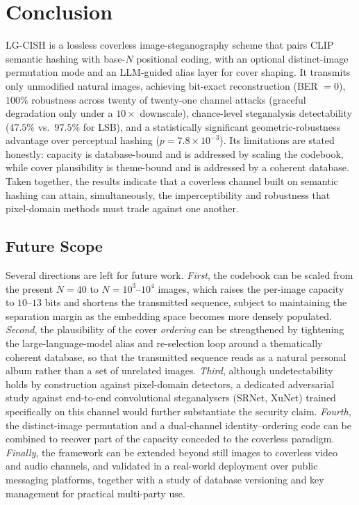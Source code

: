 \documentclass[11pt]{article}
\theoremstyle{definition}
\begin{document}
\section{Conclusion}\label{sec:conclusion}
LG-CISH is a lossless coverless image-steganography scheme that pairs CLIP
semantic hashing with base-$N$ positional coding, with an optional distinct-image
permutation mode and an LLM-guided alias layer for cover shaping. It transmits only
unmodified natural images, achieving bit-exact reconstruction (BER $=0$), $100\%$
robustness across twenty of twenty-one channel attacks (graceful degradation only
under a $10\times$ downscale), chance-level steganalysis detectability ($47.5\%$
vs.\ $97.5\%$ for LSB), and a statistically significant geometric-robustness
advantage over perceptual hashing ($p{=}7.8\times10^{-3}$). Its limitations are
stated honestly: capacity is database-bound and is addressed by scaling the
codebook, while cover plausibility is theme-bound and is addressed by a coherent
database. Taken together, the results indicate that a coverless channel built on
semantic hashing can attain, simultaneously, the imperceptibility and robustness
that pixel-domain methods must trade against one another.

\subsection{Future Scope}\label{sec:future}
Several directions are left for future work. \emph{First}, the codebook can be
scaled from the present $N{=}40$ to $N{=}10^{3}$--$10^{4}$ images, which raises the
per-image capacity to $10$--$13$ bits and shortens the transmitted sequence, subject
to maintaining the separation margin as the embedding space becomes more densely
populated. \emph{Second}, the plausibility of the cover \emph{ordering} can be
strengthened by tightening the large-language-model alias and re-selection loop
around a thematically coherent database, so that the transmitted sequence reads as a
natural personal album rather than a set of unrelated images. \emph{Third}, although
undetectability holds by construction against pixel-domain detectors, a dedicated
adversarial study against end-to-end convolutional steganalysers (SRNet, XuNet)
trained specifically on this channel would further substantiate the security claim.
\emph{Fourth}, the distinct-image permutation and a dual-channel identity--ordering
code can be combined to recover part of the capacity conceded to the coverless
paradigm. \emph{Finally}, the framework can be extended beyond still images to
coverless video and audio channels, and validated in a real-world deployment over
public messaging platforms, together with a study of database versioning and key
management for practical multi-party use.
\end{document}
